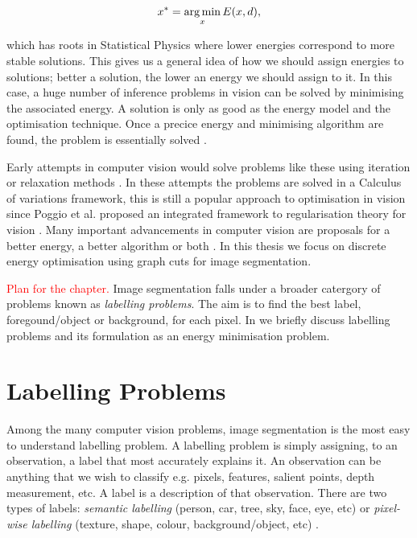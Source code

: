 \begin{equation}
	x^{*} = \operatorname*{arg\,min}_{x}E(x,d),
	\label{eq:gibbsenergy}
\end{equation}

which has roots in Statistical Physics where lower energies correspond to more stable solutions.
This gives us a general idea of how we should assign energies to solutions; better a solution, the lower an energy we should assign to it.
In this case, a huge number of inference problems in vision can be solved by minimising the associated energy.
A solution is only as good as the energy model and the optimisation technique. Once a precice energy and minimising algorithm are found, the problem is essentially solved \citep{Delong2011}. 

Early attempts in computer vision would solve problems like these using iteration or relaxation methods \citep{Waltz1975,Rosenfeld1976}.
In these attempts the problems are solved in a Calculus of variations framework, this is still a popular approach to optimisation in vision since Poggio et al. \citep{Poggio1985} proposed an integrated framework to regularisation theory for vision \citep{Sakaue1999}.
Many important advancements in computer vision are proposals for a better energy, a better algorithm or both \citep{Delong2011,Boykov2001,Kolmogorov2005,Mumford1989,Shi1997}.
In this thesis we focus on discrete energy optimisation using graph cuts for image segmentation.

\textcolor{red}{Plan for the chapter.}
Image segmentation falls under a broader catergory of problems known as \textit{labelling problems}.
The aim is to find the best label, foregound/object or background, for each pixel.
In  we briefly discuss labelling problems and its formulation as an energy minimisation problem.


\section{Labelling Problems}
\label{sec:LabellingProblems}

Among the many computer vision problems, image segmentation is the most easy to understand labelling problem.
A labelling problem is simply assigning, to an observation, a label that most accurately explains it.
An observation can be anything that we wish to classify e.g. pixels, features, salient points, depth measurement, etc.
A label is a description of that observation.
There are two types of labels: \textit{semantic labelling} (person, car, tree, sky, face, eye, etc) or \textit{pixel-wise labelling} (texture, shape, colour, background/object, etc) \citep{Delong2011,Athanasiadis2007}.

